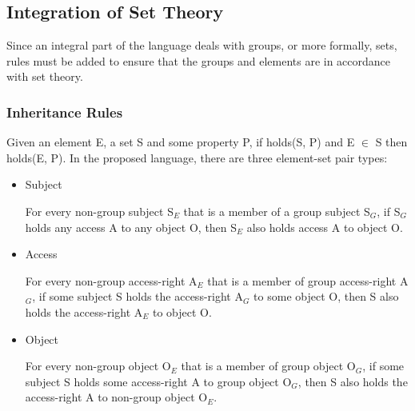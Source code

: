 \documentclass[a4paper]{article}
\begin{document}
    \subsection{Integration of Set Theory}

      Since an integral part of the language deals with groups, or more
      formally, sets, rules must be added to ensure that the groups and
      elements are in accordance with set theory.

      \subsubsection{Inheritance Rules}

        Given an element E, a set S and some property P, if holds(S, P) and 
        E $\in$ S then holds(E, P). In the proposed language, there are three
        element-set pair types:

        \begin{itemize}
          \item
            Subject


            For every non-group subject S$_{E}$ that is a member of a group
            subject S$_{G}$, if S$_{G}$ holds any access A to any object O,
            then S$_{E}$ also holds access A to object O.
          \item
            Access


            For every non-group access-right A$_{E}$ that is a member of group
            access-right A$_{G}$, if some subject S holds the access-right
            A$_{G}$ to some object O, then S also holds the access-right 
            A$_{E}$ to object O.
          \item
            Object 


            For every non-group object O$_{E}$ that is a member of group
            object O$_{G}$, if some subject S holds some access-right A to
            group object O$_{G}$, then S also holds the access-right A to
            non-group object O$_{E}$.
        \end{itemize}
\end{document}
